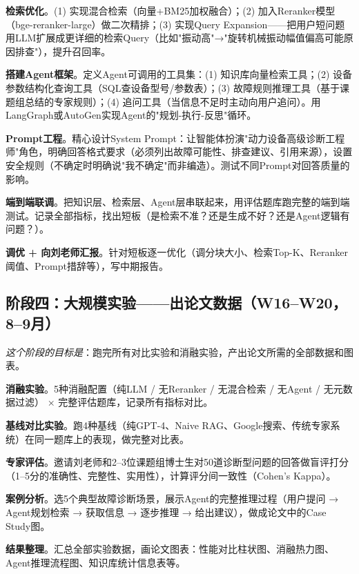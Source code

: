 \documentclass[a4paper, 11pt]{ctexart}
\begin{document}
\begin{description}[style=nextline, leftmargin=1.2cm, labelwidth=1cm, font=\bfseries\color{tsinghua}]
\item[W11] \textbf{检索优化}。(1) 实现混合检索（向量+BM25加权融合）；(2) 加入Reranker模型（bge-reranker-large）做二次精排；(3) 实现Query Expansion——把用户短问题用LLM扩展成更详细的检索Query（比如"振动高"→"旋转机械振动幅值偏高可能原因排查"），提升召回率。
\item[W12] \textbf{搭建Agent框架}。定义Agent可调用的工具集：(1) 知识库向量检索工具；(2) 设备参数结构化查询工具（SQL查设备型号/参数表）；(3) 故障规则推理工具（基于课题组总结的专家规则）；(4) 追问工具（当信息不足时主动向用户追问）。用LangGraph或AutoGen实现Agent的"规划-执行-反思"循环。
\item[W13] \textbf{Prompt工程}。精心设计System Prompt：让智能体扮演"动力设备高级诊断工程师"角色，明确回答格式要求（必须列出故障可能性、排查建议、引用来源），设置安全规则（不确定时明确说"我不确定"而非编造）。测试不同Prompt对回答质量的影响。
\item[W14] \textbf{端到端联调}。把知识层、检索层、Agent层串联起来，用评估题库跑完整的端到端测试。记录全部指标，找出短板（是检索不准？还是生成不好？还是Agent逻辑有问题？）。
\item[W15] \textbf{调优 + 向刘老师汇报}。针对短板逐一优化（调分块大小、检索Top-K、Reranker阈值、Prompt措辞等），写中期报告。
\end{description}

\subsection{阶段四：大规模实验——出论文数据（W16--W20，8--9月）}

\noindent\textit{这个阶段的目标是}：跑完所有对比实验和消融实验，产出论文所需的全部数据和图表。

\begin{description}[style=nextline, leftmargin=1.2cm, labelwidth=1cm, font=\bfseries\color{tsinghua}]
\item[W16] \textbf{消融实验}。5种消融配置（纯LLM / 无Reranker / 无混合检索 / 无Agent / 无元数据过滤） × 完整评估题库，记录所有指标对比。
\item[W17] \textbf{基线对比实验}。跑4种基线（纯GPT-4、Naive RAG、Google搜索、传统专家系统）在同一题库上的表现，做完整对比表。
\item[W18] \textbf{专家评估}。邀请刘老师和2--3位课题组博士生对50道诊断型问题的回答做盲评打分（1--5分的准确性、完整性、实用性），计算评分间一致性（Cohen's Kappa）。
\item[W19] \textbf{案例分析}。选5个典型故障诊断场景，展示Agent的完整推理过程（用户提问 → Agent规划检索 → 获取信息 → 逐步推理 → 给出建议），做成论文中的Case Study图。
\item[W20] \textbf{结果整理}。汇总全部实验数据，画论文图表：性能对比柱状图、消融热力图、Agent推理流程图、知识库统计信息表等。
\end{description}
\end{document}
